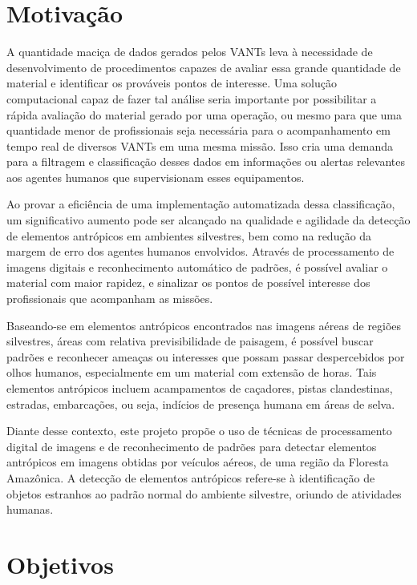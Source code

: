 \section{Motivação}

A quantidade maciça de dados gerados pelos VANTs leva à necessidade de desenvolvimento de procedimentos capazes de avaliar essa grande quantidade de material e identificar os prováveis pontos de interesse. Uma solução computacional capaz de fazer tal análise seria importante por possibilitar a rápida avaliação do material gerado por uma operação, ou mesmo para que uma quantidade menor de profissionais seja necessária para o acompanhamento em tempo real de diversos VANTs em uma mesma missão. Isso cria uma demanda para a filtragem e classificação desses dados em informações ou alertas relevantes aos agentes humanos que supervisionam esses equipamentos.

Ao provar a eficiência de uma implementação automatizada dessa classificação, um significativo aumento pode ser alcançado na qualidade e agilidade da detecção de elementos antrópicos em ambientes silvestres, bem como na redução da margem de erro dos agentes humanos envolvidos. Através de processamento de imagens digitais e reconhecimento automático de padrões, é possível avaliar o material com maior rapidez, e sinalizar os pontos de possível interesse dos profissionais que acompanham as missões.

Baseando-se em elementos antrópicos encontrados nas imagens aéreas de regiões silvestres, áreas com relativa previsibilidade de paisagem, é possível buscar padrões e reconhecer ameaças ou interesses que possam passar despercebidos por olhos humanos, especialmente em um material com extensão de horas. Tais elementos antrópicos incluem acampamentos de caçadores, pistas clandestinas, estradas, embarcações, ou seja, indícios de presença humana em áreas de selva.

Diante desse contexto, este projeto propõe o uso de técnicas de processamento digital de imagens e de reconhecimento de padrões para detectar elementos antrópicos em imagens obtidas por veículos aéreos, de uma região da Floresta Amazônica. A detecção de elementos antrópicos refere-se à identificação de objetos estranhos ao padrão normal do ambiente silvestre, oriundo de atividades humanas.

\section{Objetivos}

